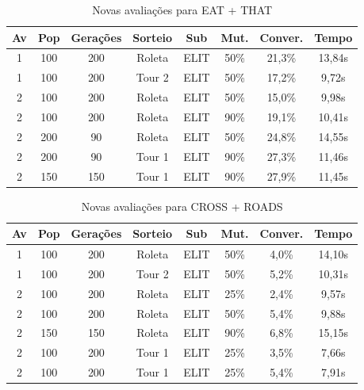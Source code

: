 \documentclass[a4paper, 12pt]{article}
\begin{document}
  \begin{table}[h]
    \centering
    \begin{tabular}{|c|c|c|c|c|c|c|c|}
      \hline
      Av & Pop & Gerações & Sorteio & Sub & Mut. & Conver. & Tempo  \\
      \hline
      1 & 100 & 200 & Roleta & ELIT & 50\% &21,3\% & 13,84s \\
      \hline
      1 & 100 & 200 & Tour 2 & ELIT & 50\% &17,2\% & 9,72s \\
      \hline
      2 & 100 & 200 & Roleta & ELIT & 50\% &15,0\% & 9,98s \\
      \hline
      2 & 100 & 200 & Roleta & ELIT & 90\% &19,1\% & 10,41s \\
      \hline
      2 & 200 & 90 & Roleta & ELIT & 50\% &24,8\% & 14,55s \\
      \hline
      2 & 200 & 90 & Tour 1 & ELIT & 90\% &27,3\% & 11,46s \\
      \hline
      2 & 150 & 150 & Tour 1 & ELIT & 90\% &27,9\% & 11,45s \\
      \hline
    \end{tabular}
    \caption{Novas avaliações para EAT + THAT}
    \label{tab:eat}
  \end{table}

  \begin{table}[h]
    \centering
    \begin{tabular}{|c|c|c|c|c|c|c|c|}
      \hline
      Av & Pop & Gerações & Sorteio & Sub & Mut. & Conver. & Tempo  \\
      \hline
      1 & 100 & 200 & Roleta & ELIT & 50\% &4,0\% & 14,10s \\
      \hline
      1 & 100 & 200 & Tour 2 & ELIT & 50\% &5,2\% & 10,31s \\
      \hline
      2 & 100 & 200 & Roleta & ELIT & 25\% &2,4\% & 9,57s \\
      \hline
      2 & 100 & 200 & Roleta & ELIT & 50\% &5,4\% & 9,88s \\
      \hline
      2 & 150 & 150 & Roleta & ELIT & 90\% &6,8\% & 15,15s \\
      \hline
      2 & 100 & 200 & Tour 1 & ELIT & 25\% &3,5\% & 7,66s \\
      \hline
      2 & 100 & 200 & Tour 1 & ELIT & 25\% &5,4\% & 7,91s \\
      \hline
    \end{tabular}
    \caption{Novas avaliações para CROSS + ROADS}
    \label{tab:cross}
  \end{table}
\end{document}

